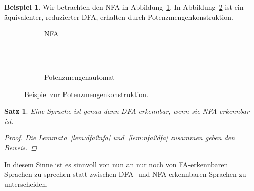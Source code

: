 \documentclass[11pt, a4paper]{article}
\theoremstyle{definition}
\newtheorem{example}[definition]{Beispiel}
\theoremstyle{plain}
\newtheorem{theorem}[definition]{Satz}
\numberwithin{equation}{section}
\begin{document}
\begin{example}
	Wir betrachten den NFA in Abbildung~\ref{fig:powersetconstruction_nfa}. In Abbildung~\ref{fig:powersetconstruction_dfa} ist ein äquivalenter, reduzierter DFA, erhalten durch Potenzmengenkonstruktion.
\end{example}
\begin{figure}
	\centering
	\begin{subfigure}[b]{.49\textwidth}
		\centering
		
		\caption{NFA}
		\label{fig:powersetconstruction_nfa}
	\end{subfigure}\\
	\ \\
	\begin{subfigure}[b]{.49\textwidth}
		\centering
		
		\caption{Potenzmengenautomat}
		\label{fig:powersetconstruction_dfa}
	\end{subfigure}
	\caption{Beispiel zur Potenzmengenkonstruktion.}
	\label{fig:powersetconstruction}
\end{figure}
\begin{theorem}
	Eine Sprache ist genau dann DFA-erkennbar, wenn sie NFA-erkennbar ist.
	\begin{proof}
		Die Lemmata~\ref{lem:dfa2nfa} und~\ref{lem:nfa2dfa} zusammen geben den Beweis.
	\end{proof}
\end{theorem}
In diesem Sinne ist es sinnvoll von nun an nur noch von FA-erkennbaren Sprachen zu sprechen statt zwischen DFA- und NFA-erkennbaren Sprachen zu unterscheiden.
\end{document}
